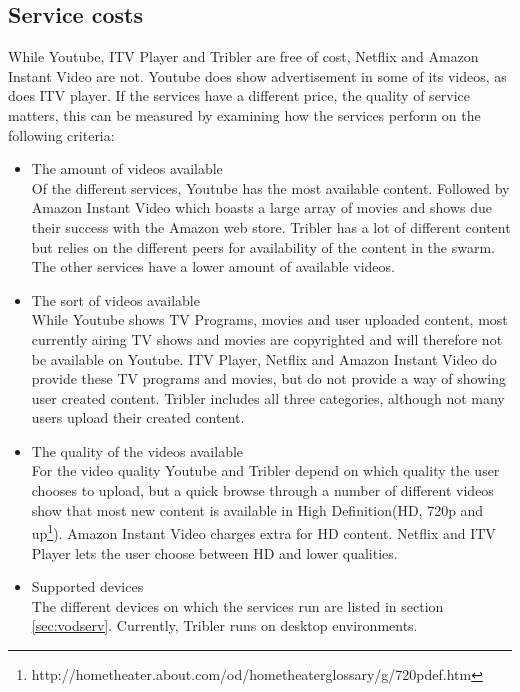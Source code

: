 \subsection{Service costs}
While Youtube, ITV Player and Tribler are free of cost, Netflix and Amazon Instant Video are not. Youtube does show advertisement in some of its videos, as does ITV player. If the services have a different price, the quality of service matters, this can be measured by examining how the services perform on the following criteria:
\begin{itemize}
\item The amount of videos available\\
Of the different services, Youtube has the most available content. Followed by Amazon Instant Video which boasts a large array of movies and shows due their success with the Amazon web store. Tribler has a lot of different content but relies on the different peers for availability of the content in the swarm. The other services have a lower amount of available videos.
\item The sort of videos available\\
While Youtube shows TV Programs, movies and user uploaded content, most currently airing TV shows and movies are copyrighted and will therefore not be available on Youtube. ITV Player, Netflix and Amazon Instant Video do provide these TV programs and movies, but do not provide a way of showing user created content. Tribler includes all three categories, although not many users upload their created content.
\item The quality of the videos available\\
For the video quality Youtube and Tribler depend on which quality the user chooses to upload, but a quick browse through a number of different videos show that most new content is available in  High Definition(HD, 720p and up\footnote{http://hometheater.about.com/od/hometheaterglossary/g/720pdef.htm}). Amazon Instant Video charges extra for HD content. Netflix and ITV Player lets the user choose between HD and lower qualities.
\item Supported devices\\
The different devices on which the services run are listed in section \ref{sec:vodserv}. Currently, Tribler runs on desktop environments.
\end{itemize}
